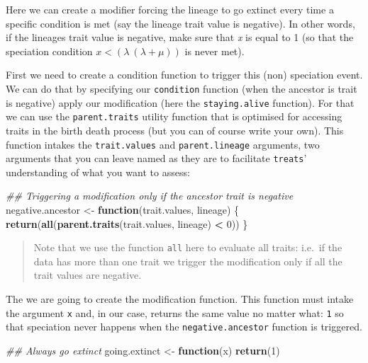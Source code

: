 \documentclass[
]{book}
\newenvironment{Shaded}{\begin{snugshade}}{\end{snugshade}}
\newcommand{\CommentTok}[1]{\textcolor[rgb]{0.56,0.35,0.01}{\textit{#1}}}
\newcommand{\ControlFlowTok}[1]{\textcolor[rgb]{0.13,0.29,0.53}{\textbf{#1}}}
\newcommand{\DecValTok}[1]{\textcolor[rgb]{0.00,0.00,0.81}{#1}}
\newcommand{\KeywordTok}[1]{\textcolor[rgb]{0.13,0.29,0.53}{\textbf{#1}}}
\newcommand{\NormalTok}[1]{#1}
\newcommand{\OperatorTok}[1]{\textcolor[rgb]{0.81,0.36,0.00}{\textbf{#1}}}
\newcommand{\StringTok}[1]{\textcolor[rgb]{0.31,0.60,0.02}{#1}}
\begin{document}
Here we can create a modifier forcing the lineage to go extinct every time a specific condition is met (say the lineage trait value is negative).
In other words, if the lineages trait value is negative, make sure that \emph{x} is equal to 1 (so that the speciation condition \(x < (\lambda \ (\lambda + \mu))\) is never met).

First we need to create a condition function to trigger this (non) speciation event.
We can do that by specifying our \texttt{condition} function (when the ancestor is trait is negative) apply our modification (here the \texttt{staying.alive} function).
For that we can use the \texttt{parent.traits} utility function that is optimised for accessing traits in the birth death process (but you can of course write your own).
This function intakes the \texttt{trait.values} and \texttt{parent.lineage} arguments, two arguments that you can leave named as they are to facilitate \texttt{treats}' understanding of what you want to assess:

\begin{Shaded}
\begin{Highlighting}[]
\CommentTok{\#\# Triggering a modification only if the ancestor trait is negative}
\NormalTok{negative.ancestor \textless{}{-}}\StringTok{ }\ControlFlowTok{function}\NormalTok{(trait.values, lineage) \{}
    \KeywordTok{return}\NormalTok{(}\KeywordTok{all}\NormalTok{(}\KeywordTok{parent.traits}\NormalTok{(trait.values, lineage) }\OperatorTok{\textless{}}\StringTok{ }\DecValTok{0}\NormalTok{))}
\NormalTok{\}}
\end{Highlighting}
\end{Shaded}

\begin{quote}
Note that we use the function \texttt{all} here to evaluate all traits: i.e.~if the data has more than one trait we trigger the modification only if all the trait values are negative.
\end{quote}

The we are going to create the modification function.
This function must intake the argument \texttt{x} and, in our case, returns the same value no matter what: \texttt{1} so that speciation never happens when the \texttt{negative.ancestor} function is triggered.

\begin{Shaded}
\begin{Highlighting}[]
\CommentTok{\#\# Always go extinct}
\NormalTok{going.extinct \textless{}{-}}\StringTok{ }\ControlFlowTok{function}\NormalTok{(x) }\KeywordTok{return}\NormalTok{(}\DecValTok{1}\NormalTok{)}
\end{Highlighting}
\end{Shaded}
\end{document}
